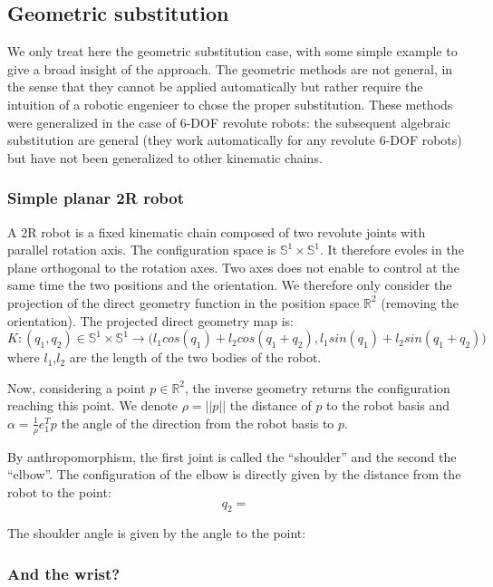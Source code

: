 \documentclass{book}
\begin{document}
\subsection{Geometric substitution}

We only treat here the geometric substitution case, with some simple example to give a broad insight of the approach. The geometric methods are not general, in the sense that they cannot be applied automatically but rather require the intuition of a robotic engenieer to chose the proper substitution. These methods were generalized in the case of 6-DOF revolute robots: the subsequent algebraic substitution are general (they work automatically for any revolute 6-DOF robots) but have not been generalized to other kinematic chains. 

\subsubsection{Simple planar 2R robot}

A 2R robot is a fixed kinematic chain composed of two revolute joints with parallel rotation axis. The configuration space is $\mathbb{S}^1  \times \mathbb{S}^1$. It therefore evoles in the plane orthogonal to the rotation axes. Two axes does not enable to control at the same time the two positions and the orientation. We therefore only consider the projection of the direct geometry function in the position space $\mathbb{R}^2$ (removing the orientation). The projected direct geometry map is:
\[ K: (q_1,q_2) \in \mathbb{S}^1  \times \mathbb{S}^1 \rightarrow \Big( l_1 cos(q_1)+ l_2 cos(q_1+q_2),l_1 sin(q_1)+ l_2 sin(q_1+q_2) \Big) \]
where $l_1$,$l_2$ are the length of the two bodies of the robot.

Now, considering a point $p \in \mathbb{R}^2$, the inverse geometry returns the configuration reaching this point. We denote $\rho = || p ||$ the distance of $p$ to the robot basis and $\alpha = \frac{1}{\rho} e_1^T p$ the angle of the direction from the robot basis to $p$.

By anthropomorphism, the first joint is called the ``shoulder'' and the second the ``elbow''. The configuration of the elbow is directly given by the distance from the robot to the point:
\[ q_2 = \]

The shoulder angle is given by the angle to the point:
\[ \]

\subsubsection{And the wrist?}
\end{document}
